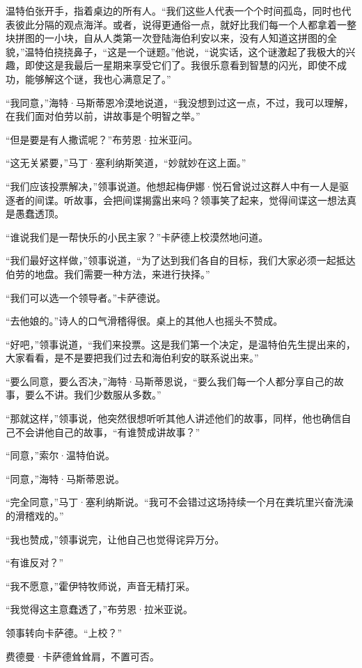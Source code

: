 \documentclass[AutoFakeBold=true]{book}
\begin{document}
温特伯张开手，指着桌边的所有人。``我们这些人代表一个个时间孤岛，同时也代表彼此分隔的观点海洋。或者，说得更通俗一点，就好比我们每一个人都拿着一整块拼图的一小块，自从人类第一次登陆海伯利安以来，没有人知道这拼图的全貌，''温特伯挠挠鼻子，``这是一个谜题。''他说，``说实话，这个谜激起了我极大的兴趣，即使这是我最后一星期来享受它们了。我很乐意看到智慧的闪光，即使不成功，能够解这个谜，我也心满意足了。''

``我同意，''海特·马斯蒂恩冷漠地说道，``我没想到过这一点，不过，我可以理解，在我们面对伯劳以前，讲故事是个明智之举。''

``但是要是有人撒谎呢？''布劳恩·拉米亚问。

``这无关紧要，''马丁·塞利纳斯笑道，``妙就妙在这上面。''

``我们应该投票解决，''领事说道。他想起梅伊娜·悦石曾说过这群人中有一人是驱逐者的间谍。听故事，会把间谍揭露出来吗？领事笑了起来，觉得间谍这一想法真是愚蠢透顶。

``谁说我们是一帮快乐的小民主家？''卡萨德上校漠然地问道。

``我们最好这样做，''领事说道，``为了达到我们各自的目标，我们大家必须一起抵达伯劳的地盘。我们需要一种方法，来进行抉择。''

``我们可以选一个领导者。''卡萨德说。

``去他娘的。''诗人的口气滑稽得很。桌上的其他人也摇头不赞成。

``好吧，''领事说道，``我们来投票。这是我们第一个决定，是温特伯先生提出来的，大家看看，是不是要把我们过去和海伯利安的联系说出来。''

``要么同意，要么否决，''海特·马斯蒂恩说，``要么我们每一个人都分享自己的故事，要么不讲。我们少数服从多数。''

``那就这样，''领事说，他突然很想听听其他人讲述他们的故事，同样，他也确信自己不会讲他自己的故事，``有谁赞成讲故事？''

``同意，''索尔·温特伯说。

``同意，''海特·马斯蒂恩说。

``完全同意，''马丁·塞利纳斯说。``我可不会错过这场持续一个月在粪坑里兴奋洗澡的滑稽戏的。''

``我也赞成，''领事说完，让他自己也觉得诧异万分。

``有谁反对？''

``我不愿意，''霍伊特牧师说，声音无精打采。

``我觉得这主意蠢透了，''布劳恩·拉米亚说。

领事转向卡萨德。``上校？''

费德曼·卡萨德耸耸肩，不置可否。
\end{document}
